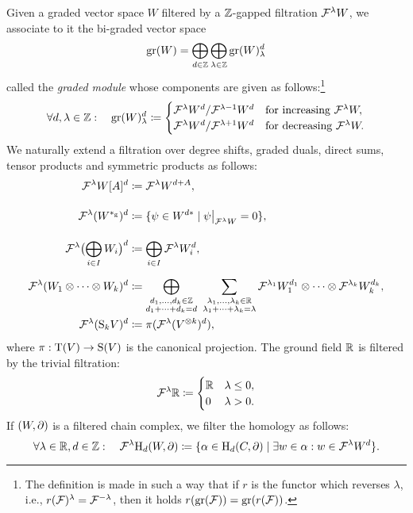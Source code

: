\documentclass[\MainFolder/Text.tex]{subfiles}
\begin{document}
\begin{Definition}[Filtrations]
Given a graded vector space $W$ filtered by a $\mathbb{Z}$-gapped filtration $\mathcal{F}^\lambda W$, we associate to it the bi-graded vector space 
$$ \operatorname{\mathrm{gr}}(W) = \bigoplus_{d\in\mathbb{Z}}\bigoplus_{\lambda\in \mathbb{Z}} \operatorname{\mathrm{gr}}(W)_\lambda^d $$
called the \emph{graded module} whose components are given as follows:\footnote{The definition is made in such a way that if $r$ is the functor which reverses $\lambda$, i.e., $r(\mathcal{F})^\lambda = \mathcal{F}^{-\lambda}$, then it holds $r(\operatorname{\mathrm{gr}}(\mathcal{F})) = \operatorname{\mathrm{gr}}(r(\mathcal{F}))$. }
$$ \forall d, \lambda\in \mathbb{Z}: \quad \operatorname{\mathrm{gr}}(W)_\lambda^d \coloneqq \begin{cases}
                   \mathcal{F}^\lambda W^d /\mathcal{F}^{\lambda-1} W^d & \text{for increasing }\mathcal{F}^\lambda W,\\
                   \mathcal{F}^{\lambda} W^d / \mathcal{F}^{\lambda+1} W^d & \text{for decreasing } \mathcal{F}^\lambda W.
                 \end{cases}$$
We naturally extend a filtration over degree shifts, graded duals, direct sums, tensor products and symmetric products as follows: \allowdisplaybreaks
\begin{align*}
\Filtr^\lambda W[A]^d &\coloneqq \Filtr^\lambda W^{d+A},\\[3.5\jot]
\Filtr^\lambda (W^{\GD})^d &\coloneqq \{\psi\in W^{d*} \mid \Restr{\psi}{\Filtr^\lambda W} = 0\}, \\[3.5\jot]
\Filtr^\lambda\bigl(\bigoplus_{i\in I} W_i\bigr)^d &\coloneqq \bigoplus_{i\in I} \Filtr^{\lambda} W_i^d, \\[2\jot]
\Filtr^{\lambda}(W_1 \otimes \dotsb \otimes W_k)^d &\coloneqq \bigoplus_{\substack{d_1, \dotsc, d_k\in \Z \\ d_1 + \dotsb + d_k = d}}\ \sum_{\substack{\lambda_1, \dotsc, \lambda_k \in \R \\ \lambda_1 + \dotsb + \lambda_k = \lambda}} \Filtr^{\lambda_1} W_1^{d_1} \otimes \dotsb \otimes \Filtr^{\lambda_k} W_k^{d_k},\\
\Filtr^\lambda (\Sym_k V)^d &\coloneqq \pi(\Filtr^\lambda(V^{\otimes k})^d),
\end{align*}
where $\pi: \mathrm{T}(V) \rightarrow \mathrm{S}(V)$ is the canonical projection. The ground field $\mathbb{R}$ is filtered by the trivial filtration:
\begin{equation}\label{Eq:TrivFiltr}
\mathcal{F}^\lambda \mathbb{R} \coloneqq \begin{cases} \mathbb{R} & \lambda\le 0, \\ 0 & \lambda >0. \end{cases}
\end{equation}
If $(W,\partial)$ is a filtered chain complex, we filter the homology as follows:
$$ \forall \lambda \in \mathbb{R}, d\in \mathbb{Z}: \quad \mathcal{F}^\lambda \mathrm{H}_d(W,\partial) \coloneqq \{\alpha \in \mathrm{H}_d(C,\partial) \mid \exists w\in \alpha: w\in \mathcal{F}^\lambda W^d \}. $$
\end{Definition}
\end{document}
